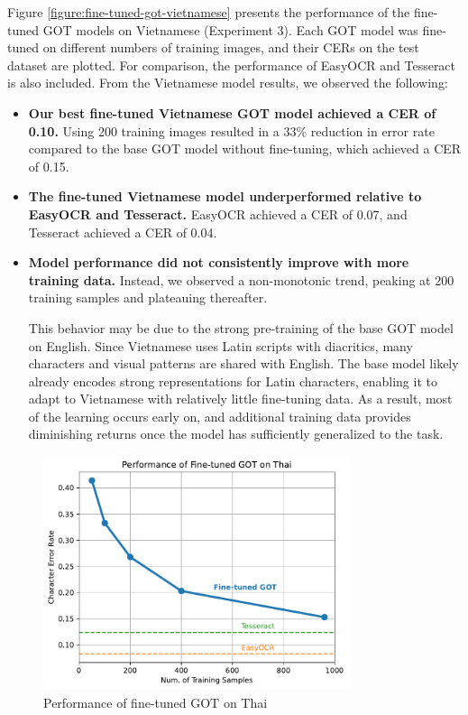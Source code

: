\documentclass[12pt,oneside]{memoir}
\begin{document}
Figure \ref{figure:fine-tuned-got-vietnamese} presents the performance of the fine-tuned GOT models on Vietnamese (Experiment 3). 
Each GOT model was fine-tuned on different numbers of training images, and their CERs on the test dataset are plotted.
For comparison, the performance of EasyOCR and Tesseract is also included.
From the Vietnamese model results, we observed the following:

\begin{itemize}
    \item \textbf{Our best fine-tuned Vietnamese GOT model achieved a CER of 0.10.}
    Using 200 training images resulted in a 33\% reduction in error rate compared to the base GOT model without fine-tuning, which achieved a CER of 0.15.
    \item \textbf{The fine-tuned Vietnamese model underperformed relative to EasyOCR and Tesseract.} EasyOCR achieved a CER of 0.07, and Tesseract achieved a CER of 0.04.
    \item \textbf{Model performance did not consistently improve with more training data.} 
    Instead, we observed a non-monotonic trend, peaking at 200 training samples and plateauing thereafter.

    This behavior may be due to the strong pre-training of the base GOT model on English.
    Since Vietnamese uses Latin scripts with diacritics, many characters and visual patterns are shared with English.
    The base model likely already encodes strong representations for Latin characters, enabling it to adapt to Vietnamese with relatively little fine-tuning data.
    As a result, most of the learning occurs early on, and additional training data provides diminishing returns once the model has sufficiently generalized to the task.
\end{itemize}

\begin{figure}[ht]
    \centering
    \includegraphics[width=0.8\textwidth]{images/fine-tuned-got-thai.pdf}
    \caption{Performance of fine-tuned GOT on Thai}
    \label{figure:fine-tuned-got-thai}
\end{figure}
\end{document}
